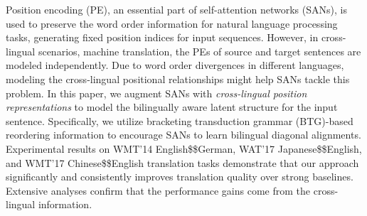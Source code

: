Position encoding (PE), an essential part of self-attention networks (SANs), is used to preserve the word order information for natural language processing tasks, generating fixed position indices for input sequences. However, in cross-lingual scenarios, \eg machine translation, the PEs of source and target sentences are modeled independently. Due to word order divergences in different languages, modeling the cross-lingual positional relationships might help SANs tackle this problem. In this paper, we augment SANs with \emph{cross-lingual position representations} to model the bilingually aware latent structure for the input sentence. Specifically, we utilize bracketing transduction grammar (BTG)-based reordering information to encourage SANs to learn bilingual diagonal alignments. Experimental results on WMT'14 English\$\Rightarrow\$German, WAT'17 Japanese\$\Rightarrow\$English, and WMT'17 Chinese\$\Leftrightarrow\$English translation tasks demonstrate that our approach significantly and consistently improves translation quality over strong baselines. Extensive analyses confirm that the performance gains come from the cross-lingual information.
